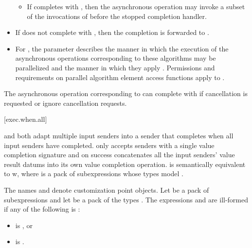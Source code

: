 \begin{itemize}
\begin{itemize}
  \item
  If  completes with , then
  the asynchronous operation may invoke a subset of
  the invocations of 
  before the stopped completion handler.
  \end{itemize}

\item
If  does not complete with , then
the completion is forwarded to .

\item
For ,
the parameter  describes
the manner in which
the execution of the asynchronous operations corresponding to these algorithms
may be parallelized and
the manner in which
they apply .
Permissions and requirements
on parallel algorithm element access functions
apply to .
\end{itemize}

\pnum
\begin{note}
The asynchronous operation corresponding to
can complete with  if cancellation is requested or
ignore cancellation requests.
\end{note}

[exec.when.all]{}

\pnum
{} and 
both adapt multiple input senders into a sender
that completes when all input senders have completed.
 only accepts senders
with a single value completion signature and
on success concatenates all the input senders' value result datums
into its own value completion operation.
 is semantically equivalent to
w,
where  is a pack of subexpressions
whose types model .

\pnum
The names  and  denote
customization point objects.
Let  be a pack of subexpressions and
let  be a pack of the types .
The expressions  and
 are ill-formed
if any of the following is :
\begin{itemize}
\item
{} is , or
\item
{} is .
\end{itemize}

